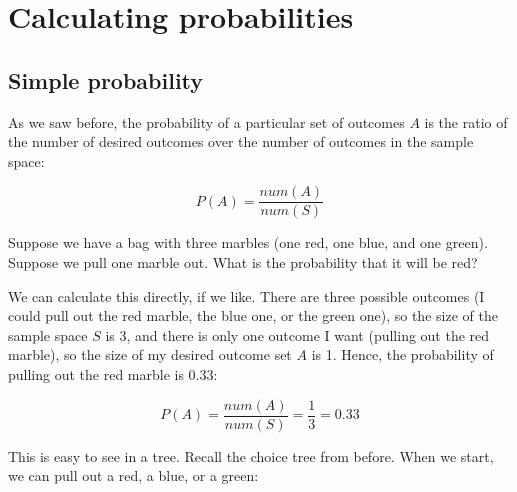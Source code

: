 \documentclass[../../../main.tex]{subfiles}
\begin{document}
\chapter{Calculating probabilities}


\section{Simple probability}

As we saw before, the probability of a particular set of outcomes $A$ is the ratio of the number of desired outcomes over the number of outcomes in the sample space:

\begin{equation*}
  P(A) = \frac{num(A)}{num(S)}
\end{equation*}

\noindent
Suppose we have a bag with three marbles (one red, one blue, and one green). Suppose we pull one marble out. What is the probability that it will be red? 

We can calculate this directly, if we like. There are three possible outcomes (I could pull out the red marble, the blue one, or the green one), so the size of the sample space $S$ is 3, and there is only one outcome I want (pulling out the red marble), so the size of my desired outcome set $A$ is 1. Hence, the probability of pulling out the red marble is 0.33:

\begin{equation*}
  P(A) = \frac{num(A)}{num(S)} = \frac{1}{3} = 0.33
\end{equation*}

\noindent
This is easy to see in a tree. Recall the choice tree from before. When we start, we can pull out a red, a blue, or a green:

\begin{center}
\end{center}
\end{document}
